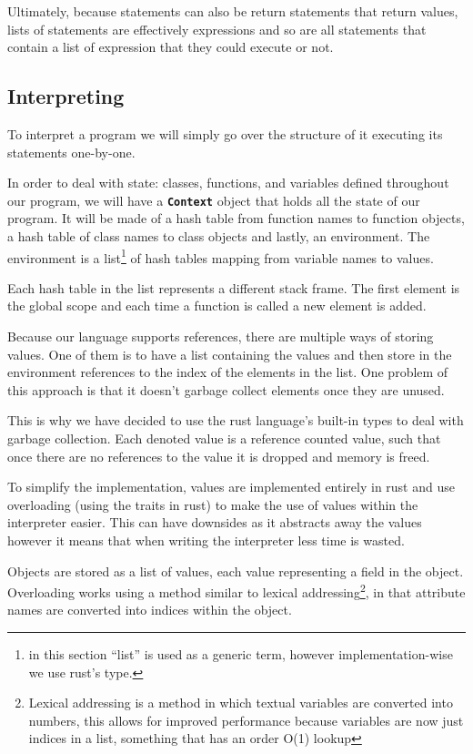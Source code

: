 \documentclass{article}
\begin{document}
Ultimately, because statements can also be return statements that return
values, lists of statements are effectively expressions and so are all
statements that contain a list of expression that they could execute or not.

\subsection{Interpreting}

To interpret a program we will simply go over the structure of it executing its
statements one-by-one.

In order to deal with state: classes, functions, and variables defined
throughout our program, we will have a \textbf{\texttt{Context}} object that
holds all the state of our program. It will be made of a hash table from
function names to function objects, a hash table of class names to class
objects and lastly, an environment. The environment is a list\footnote{in this
section ``list'' is used as a generic term, however implementation-wise we use
rust's  type.} of hash tables mapping from variable names to
values.

Each hash table in the list represents a different stack frame. The first
element is the global scope and each time a function is called a new element is
added.

Because our language supports references, there are multiple ways of storing
values. One of them is to have a list containing the values and then store in
the environment references to the index of the elements in the list. One
problem of this approach is that it doesn't garbage collect elements once they
are unused.

This is why we have decided to use the rust language's built-in types to deal
with garbage collection. Each denoted value is a reference counted value, such
that once there are no references to the value it is dropped and memory is
freed.

To simplify the implementation, values are implemented entirely in rust and use
overloading (using the traits in rust) to make the use of values within the
interpreter easier. This can have downsides as it abstracts away the values
however it means that when writing the interpreter less time is wasted.

Objects are stored as a list of values, each value representing a field in the
object. Overloading works using a method similar to lexical
addressing\footnote{Lexical addressing is a method in which textual variables
are converted into numbers, this allows for improved performance because
variables are now just indices in a list, something that has an order O(1)
lookup}, in that attribute names are converted into indices within the object.
\end{document}
